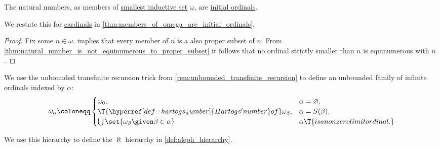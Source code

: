 \begin{proposition}\label{thm:members_of_omega_are_initial_ordinals}
  The natural numbers, as members of \hyperref[def:smallest_inductive_set]{smallest inductive set} \( \omega \), are \hyperref[def:initial_ordinal]{initial ordinals}.
\end{proposition}
\begin{comments}
  \item We restate this for \hyperref[def:cardinal]{cardinals} in \cref{thm:members_of_omega_are_initial_ordinals}.
\end{comments}
\begin{proof}
  Fix some \( n \in \omega \).  implies that every member of \( n \) is a also proper subset of \( n \). From \cref{thm:natural_number_is_not_equinumerous_to_proper_subset} it follows that no ordinal strictly smaller than \( n \) is equinumerous with \( n \).
\end{proof}

\begin{definition}\label{def:omega_hierarchy}
  We use the unbounded transfinite recursion trick from \cref{rem:unbounded_transfinite_recursion} to define an unbounded family of infinite ordinals indexed by \( \alpha \):
  \begin{equation*}
    \omega_\alpha \coloneqq \begin{cases}
      \omega_0,                                                           &\alpha = \varnothing, \\
      \T{\hyperref[def:hartogs_number]{Hartogs' number} of} \omega_\beta, &\alpha = S(\beta), \\
      \bigcup\set{ \omega_\beta \given \beta \in \alpha }                 &\alpha \T{is a nonzero limit ordinal.}
    \end{cases}
  \end{equation*}
\end{definition}
\begin{comments}
  \item We use this hierarchy to define the \( \aleph \) hierarchy in \cref{def:aleph_hierarchy}.
\end{comments}

